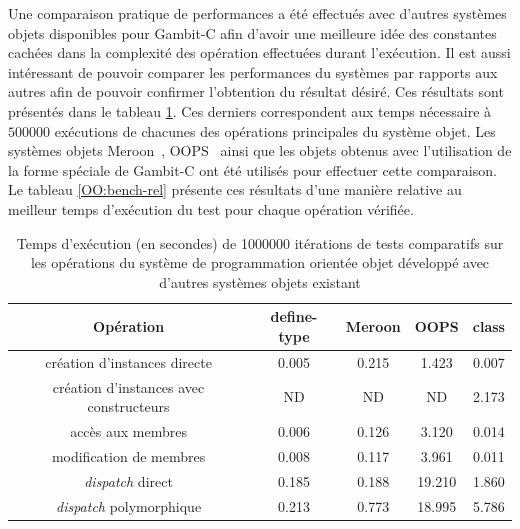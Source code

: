 \documentclass[12pt,oneside,letterpaper,francais]{book}
\newcommand{\scheme}[1]{\selectlanguage{english}{\tt #1}\selectlanguage{french}}
\begin{document}
Une comparaison pratique de performances a été effectués avec d'autres
systèmes objets disponibles pour Gambit-C afin d'avoir une meilleure
idée des constantes cachées dans la complexité des opération
effectuées durant l'exécution. Il est aussi intéressant de pouvoir
comparer les performances du systèmes par rapports aux autres afin de
pouvoir confirmer l'obtention du résultat désiré. Ces résultats sont
présentés dans le tableau \ref{OO:bench}. Ces derniers correspondent
aux temps nécessaire à $500 000$ exécutions de chacunes des opérations
principales du système objet. Les systèmes objets
Meroon~\cite{MEROON}, OOPS~\cite{OOPS} ainsi que les objets obtenus
avec l'utilisation de la forme spéciale \scheme{define-type} de
Gambit-C ont été utilisés pour effectuer cette comparaison. Le tableau
\ref{OO:bench-rel} présente ces résultats d'une manière relative au
meilleur temps d'exécution du test pour chaque opération vérifiée.

\begin{table}
  \center
  \begin{tabular}{ccccc}
    \hline
    Opération & define-type & Meroon & OOPS & class \\
    \hline \hline
    création d'instances directe            & 0.005 & 0.215 & 1.423 & 0.007\\
    création d'instances avec constructeurs & ND    & ND    & ND    & 2.173\\
    accès aux membres                       & 0.006 & 0.126 & 3.120 & 0.014\\
    modification de membres                 & 0.008 & 0.117 & 3.961 & 0.011\\
    \textit{dispatch} direct                & 0.185 & 0.188 & 19.210 & 1.860\\
    \textit{dispatch} polymorphique         & 0.213 & 0.773 & 18.995 & 5.786\\
    \hline
  \end{tabular}
  \caption{Temps d'exécution (en secondes) de 1000000 itérations de
    tests comparatifs sur les opérations du système de programmation
    orientée objet développé avec d'autres systèmes objets existant}
  \label{OO:bench}
\end{table}
\end{document}
